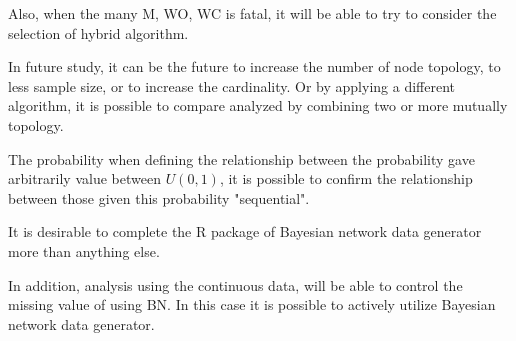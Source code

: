 Also, when the many M, WO, WC is fatal, it will be able to try to consider the selection of hybrid algorithm.

In future study, it can be the future to increase the number of node topology, to less sample size, or to increase the cardinality. Or by applying a different algorithm, it is possible to compare analyzed by combining two or more mutually topology.

The probability when defining the relationship between the probability gave arbitrarily value between $U(0,1)$, it is possible to confirm the relationship between those given this probability "sequential".

It is desirable to complete the R package of Bayesian network data generator more than anything else.

In addition, analysis using the continuous data, will be able to control the missing value of using BN. In this case it is possible to actively utilize Bayesian network data generator.